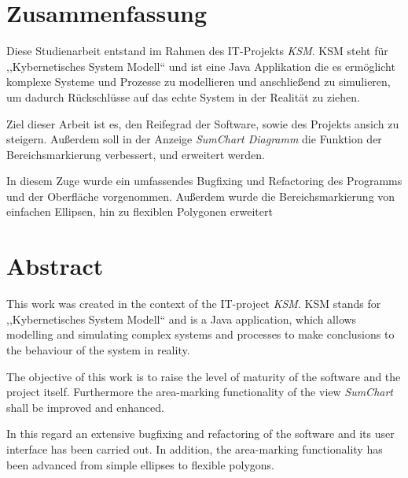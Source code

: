 \section*{Zusammenfassung}

Diese Studienarbeit entstand im Rahmen des IT-Projekts  \emph{KSM}. KSM steht für ,,Kybernetisches System Modell`` und ist eine Java Applikation die es ermöglicht komplexe Systeme und Prozesse zu modellieren und anschließend zu simulieren, um dadurch Rückschlüsse auf das echte System in der Realität zu ziehen.

Ziel dieser Arbeit ist es, den Reifegrad der Software, sowie des Projekts ansich zu steigern. Außerdem soll in der Anzeige \emph{SumChart Diagramm} die Funktion der Bereichsmarkierung verbessert, und erweitert werden.

In diesem Zuge wurde ein umfassendes Bugfixing und Refactoring des Programms und der Oberfläche vorgenommen. Außerdem wurde die Bereichsmarkierung von einfachen Ellipsen, hin zu flexiblen Polygonen erweitert
\newpage
\section*{Abstract}

This work was created in the context of the IT-project \emph{KSM}. KSM stands for ,,Kybernetisches System Modell`` and is a Java application, which allows modelling and simulating complex systems and processes to make conclusions to the behaviour of the system in reality.

The objective of this work is to raise the level of maturity of the software and the project itself. Furthermore the area-marking functionality of the view \emph{SumChart} shall be improved and enhanced.

In this regard an extensive bugfixing and refactoring of the software and its user interface has been carried out. In addition, the area-marking functionality has been advanced from simple ellipses to flexible polygons.